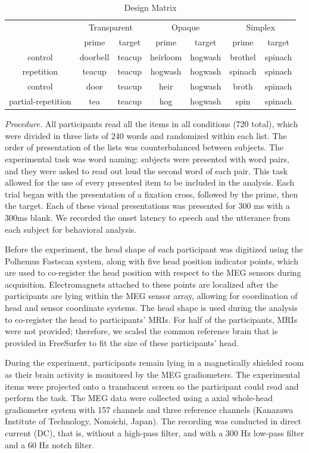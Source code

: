 \documentclass{frontiersSCNS}
\begin{document}
\begin{table}
\begin{tabular}{|c||c|c||c|c||c|c||}
\hline 
\multicolumn{1}{|c||}{\multirow{}{}{}} & \multicolumn{2}{c||}{Transparent} & \multicolumn{2}{c||}{Opaque} & \multicolumn{2}{c||}{Simplex}\tabularnewline
\cline{2-7} 
 & prime & target & prime & target & prime & target\tabularnewline
\hline 
\hline 
control & doorbell & teacup & heirloom & hogwash & brothel & spinach\tabularnewline
\hline 
repetition & teacup & teacup & hogwash & hogwash & spinach & spinach\tabularnewline
\hline 
\hline 
control & door & teacup & heir & hogwash & broth & spinach\tabularnewline
\hline 
partial-repetition & tea & teacup & hog & hogwash & spin & spinach\tabularnewline
\hline 
\end{tabular}\caption{\label{tab:Design-Matrix} Design Matrix}
\end{table}

\textit{Procedure.} All participants read all the items in all conditions (720 total), which were divided in three lists of 240 words and randomized within each list.  The order of presentation of the lists was counterbalanced between subjects.  The experimental task was word naming: subjects were presented with word pairs, and they were asked to read out loud the second word of each pair.  This task allowed for the use of every presented item to be included in the analysis. Each trial began with the presentation of a fixation cross, followed by the prime, then the target. Each of these visual presentations was presented for 300 ms with a 300ms blank. We recorded the onset latency to speech and the utterance from each subject for behavioral analysis.

Before the experiment, the head shape of each participant was digitized using the Polhemus Fastscan system, along with five head position indicator points, which are used to co-register the head position with respect to the MEG sensors during acquisition.  Electromagnets attached to these points are localized after the participants are lying within the MEG sensor array, allowing for coordination of head and sensor coordinate systems.  The head shape is used during the analysis to co-register the head to participants’ MRIs. For half of the participants, MRIs were not provided; therefore, we scaled the common reference brain that is provided in FreeSurfer to fit the size of these participants’ head.

	During the experiment, participants remain lying in a magnetically shielded room as their brain activity is monitored by the MEG gradiometers. The experimental items were projected onto a translucent screen so the participant could read and perform the task. The MEG data were collected using a axial whole-head gradiometer system with 157 channels and three reference channels (Kanazawa Institute of Technology, Nonoichi, Japan).  The recording was conducted in direct current (DC), that is, without a high-pass filter, and with a 300 Hz low-pass filter and a 60 Hz notch filter.
\end{document}
